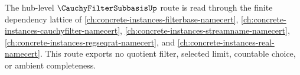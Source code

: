 The hub-level $\CauchyFilterSubbasisUp$ route is read through the finite
dependency lattice of \autoref{ch:concrete-instances-filterbase-namecert},
\autoref{ch:concrete-instances-cauchyfilter-namecert},
\autoref{ch:concrete-instances-streamname-namecert},
\autoref{ch:concrete-instances-regseqrat-namecert}, and
\autoref{ch:concrete-instances-real-namecert}. This route exports no quotient
filter, selected limit, countable choice, or ambient completeness.
